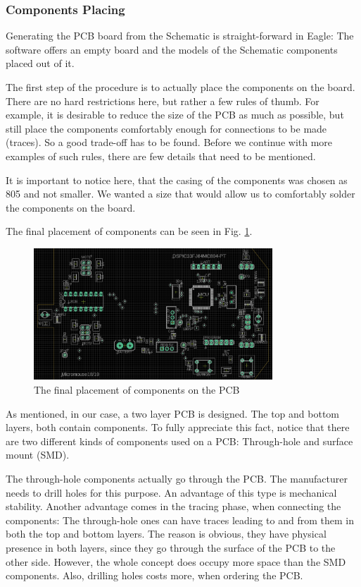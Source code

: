 \FloatBarrier

\subsubsection{Components Placing}

Generating the PCB board from the Schematic is straight-forward in Eagle: The software offers an empty board and the models of the Schematic components placed out of it.

The first step of the procedure is to actually place the components on the board. There are no hard restrictions here, but rather a few rules of thumb. For example, it is desirable to reduce the size of the PCB as much as possible, but still place the components comfortably enough for connections to be made (traces). So a good trade-off has to be found. Before we continue with more examples of such rules, there are few details that need to be mentioned.

It is important to notice here, that the casing of the components was chosen as 805 and not smaller. We wanted a size that would allow us to comfortably solder the components on the board.

The final placement of components can be seen in Fig. \ref{fig:comp}.

\begin{figure}[htb]
    \centering
    \includegraphics[width=0.8\textwidth]{figures/hardware/PCB_Components.PNG}
    \caption{The final placement of components on the PCB}
    \label{fig:comp}
\end{figure}

As mentioned, in our case, a two layer PCB is designed. The top and bottom layers, both contain components. To fully appreciate this fact, notice that there are two different kinds of components used on a PCB: Through-hole and surface mount (SMD). 

The through-hole components actually go through the PCB. The manufacturer needs to drill holes for this purpose. An advantage of this type is mechanical stability. Another advantage comes in the tracing phase, when connecting the components: The through-hole ones can have traces leading to and from them in both the top and bottom layers. The reason is obvious, they have physical presence in both layers, since they go through the surface of the PCB to the other side. However, the whole concept does occupy more space than the SMD components. Also, drilling holes costs more, when ordering the PCB.

